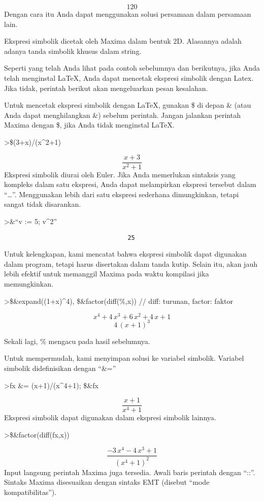 \documentclass[
]{book}
\begin{document}
\[120\]Dengan cara itu Anda dapat menggunakan solusi persamaan dalam persamaan lain.

Ekspresi simbolik dicetak oleh Maxima dalam bentuk 2D. Alasannya adalah adanya tanda simbolik khusus dalam string.

Seperti yang telah Anda lihat pada contoh sebelumnya dan berikutnya, jika Anda telah menginstal LaTeX, Anda dapat mencetak ekspresi simbolik dengan Latex. Jika tidak, perintah berikut akan mengeluarkan pesan kesalahan.

Untuk mencetak ekspresi simbolik dengan LaTeX, gunakan \$ di depan \& (atau Anda dapat menghilangkan \&) sebelum perintah. Jangan jalankan perintah Maxima dengan \$, jika Anda tidak menginstal LaTeX.

\textgreater\$(3+x)/(x\^{}2+1)

\[\frac{x+3}{x^2+1}\]Ekspresi simbolik diurai oleh Euler. Jika Anda memerlukan sintaksis yang kompleks dalam satu ekspresi, Anda dapat melampirkan ekspresi tersebut dalam ``\ldots{}''. Menggunakan lebih dari satu ekspresi sederhana dimungkinkan, tetapi sangat tidak disarankan.

\textgreater\&``v := 5; v\^{}2''

\begin{verbatim}
                                  25
\end{verbatim}

Untuk kelengkapan, kami mencatat bahwa ekspresi simbolik dapat digunakan dalam program, tetapi harus disertakan dalam tanda kutip. Selain itu, akan jauh lebih efektif untuk memanggil Maxima pada waktu kompilasi jika memungkinkan.

\textgreater\$\&expand((1+x)\^{}4), \$\&factor(diff(\%,x)) // diff: turunan, factor: faktor

\[x^4+4\,x^3+6\,x^2+4\,x+1\] \[4\,\left(x+1\right)^3\]

Sekali lagi, \% mengacu pada hasil sebelumnya.

Untuk mempermudah, kami menyimpan solusi ke variabel simbolik. Variabel simbolik didefinisikan dengan ``\&=''

\textgreater fx \&= (x+1)/(x\^{}4+1); \$\&fx

\[\frac{x+1}{x^4+1}\]Ekspresi simbolik dapat digunakan dalam ekspresi simbolik lainnya.

\textgreater\$\&factor(diff(fx,x))

\[\frac{-3\,x^4-4\,x^3+1}{\left(x^4+1\right)^2}\]Input langsung perintah Maxima juga tersedia. Awali baris perintah dengan ``::''. Sintaks Maxima disesuaikan dengan sintaks EMT (disebut ``mode kompatibilitas'').
\end{document}

